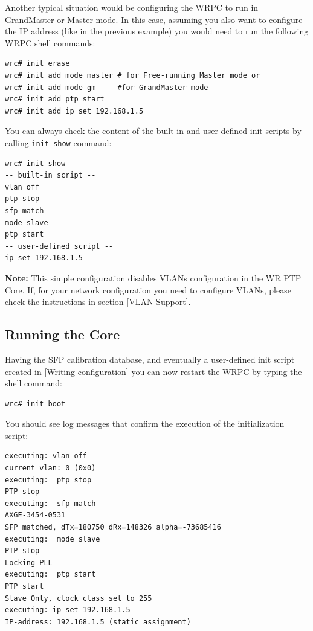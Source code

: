 \documentclass[a4paper, 12pt]{article}
\renewcommand{\_}{\underscore\allowbreak}
\begin{document}
Another typical situation would be configuring the WRPC to run in GrandMaster or
Master mode. In this case, assuming you also want to configure the IP address
(like in the previous example) you would need to run the following WRPC shell
commands:
\begin{lstlisting}
wrc# init erase
wrc# init add mode master # for Free-running Master mode or
wrc# init add mode gm     #for GrandMaster mode
wrc# init add ptp start
wrc# init add ip set 192.168.1.5
\end{lstlisting}

You can always check the content of the built-in and user-defined init scripts
by calling \texttt{init show} command:
\begin{lstlisting}
wrc# init show
-- built-in script --
vlan off
ptp stop
sfp match
mode slave
ptp start
-- user-defined script --
ip set 192.168.1.5
\end{lstlisting}

\noindent\textbf{Note:} This simple configuration disables VLANs configuration
in the WR PTP Core. If, for your network configuration you need to configure
VLANs, please check the instructions in section \ref{VLAN Support}.

\subsection{Running the Core}
\label{Running the Core}

Having the SFP calibration database, and eventually a user-defined init script
created in \ref{Writing configuration} you can now restart the WRPC by typing
the shell command:

\begin{lstlisting}
wrc# init boot
\end{lstlisting}

You should see log messages that confirm the execution of the initialization
script:
\begin{minipage}{\textwidth}
\begin{lstlisting}
executing: vlan off
current vlan: 0 (0x0)
executing:  ptp stop
PTP stop
executing:  sfp match
AXGE-3454-0531
SFP matched, dTx=180750 dRx=148326 alpha=-73685416
executing:  mode slave
PTP stop
Locking PLL
executing:  ptp start
PTP start
Slave Only, clock class set to 255
executing: ip set 192.168.1.5
IP-address: 192.168.1.5 (static assignment)
\end{lstlisting}
\end{minipage}
\end{document}
